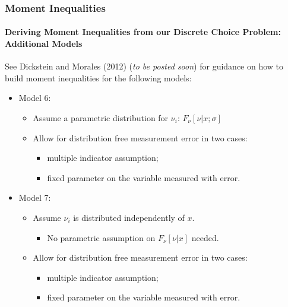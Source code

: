 \begin{frame}
\frametitle{Moment Inequalities}
\framesubtitle{Deriving Moment Inequalities from our Discrete Choice Problem: Additional Models}

See Dickstein and Morales (2012) (\textit{to be posted soon}) for guidance on how to build moment inequalities for the following models:
	\begin{itemize}
		\item Model 6:
		\begin{itemize}
			\item Assume a parametric distribution for $\nu_{i}$: $F_{\nu}[\nu|x;\sigma]$
			\item Allow for distribution free measurement error in two cases:
			\begin{itemize}
				\item multiple indicator assumption; 
				\item fixed parameter on the variable measured with error.
			\end{itemize}
		\end{itemize}
		\item Model 7:
		\begin{itemize}
			\item Assume $\nu_{i}$ is distributed independently of $x$.
			\begin{itemize}
				\item No parametric assumption on $F_{\nu}[\nu|x]$ needed.
			\end{itemize}
			\item Allow for distribution free measurement error in two cases:
			\begin{itemize}
				\item multiple indicator assumption; 
				\item fixed parameter on the variable measured with error.
			\end{itemize}
		\end{itemize}	
	\end{itemize}
\end{frame}
